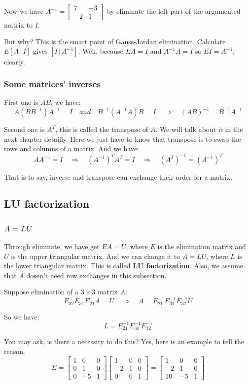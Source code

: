 \documentclass[12pt]{ctexart}
\begin{document}
Now we have $A^{-1} = \begin{bmatrix} 7 & -3 \\ -2 & 1 \end{bmatrix}$ by eliminate the
left part of the argumented matrix to $I$.

But why? This is the smart point of Gauss-Jordan elimination. Calculate $E [A\,|\,I]$
gives $[I\,|\,A^{-1}]$. Well, because $EA = I$ and $A^{-1}A = I$ so $EI = A^{-1}$, clearly.

\subsubsection{\textbf{Some matrices' inverses}}

First one is $AB$, we have:
\[
  A(BB^{-1})A^{-1} = I \quad and \quad B^{-1}(A^{-1}A)B = I \quad \Rightarrow
  \quad (AB)^{-1} = B^{-1}A^{-1}
\]

Second one is $A^{T}$, this is called the transpose of $A$. We will talk about it in
the next chapter detailly. Here we just have to know that transpose is to swap the rows
and columns of a matrix. And we have:
\[
  AA^{-1} = I \quad \Rightarrow \quad (A^{-1})^{T} A^{T} = I \quad \Rightarrow \quad
  (A^{T})^{-1} = (A^{-1})^{T}
\]

That is to say, inverse and transpose can exchange their order for a matrix.

\subsection{\textbf{LU factorization}}
\subsubsection{$A = LU$}

Through eliminate, we have get $EA = U$, where $E$ is the elimination matrix and $U$ is
the upper triangular matrix. And we can change it to $A = LU$, where $L$ is the lower
triangular matrix. This is called \textbf{LU factorization}. Also, we assume that $A$
dosen't need row exchanges in this subsection.

Suppose elimination of a $3 \times 3$ matrix $A$:
\[
  E_{32}E_{31}E_{21} A = U \quad \Rightarrow \quad A = E_{21}^{-1}E_{31}^{-1}E_{32}^{-1}U
\]

So we have:
\[
  L = E_{21}^{-1}E_{31}^{-1}E_{32}^{-1}
\]

You may ask, is there a necessity to do this? Yes, here is an example to tell the reason.
\[
  E = \begin{bmatrix}
    1 & 0 & 0 \\
    0 & 1 & 0 \\
    0 & -5 & 1
  \end{bmatrix}
  \begin{bmatrix}
    1 & 0 & 0 \\
    -2 & 1 & 0 \\
    0 & 0 & 1
  \end{bmatrix}
  =
  \begin{bmatrix}
    1 & 0 & 0 \\
    -2 & 1 & 0 \\
    10 & -5 & 1
  \end{bmatrix}
\]
\end{document}
